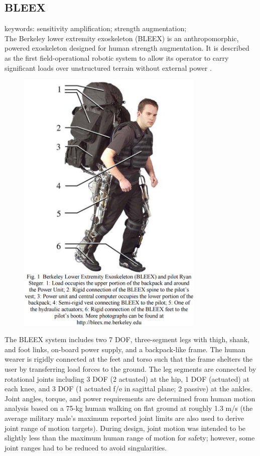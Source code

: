 \subsection{BLEEX}
\label{exo:bleex}

keywords: sensitivity amplification; strength augmentation;\\

The Berkeley lower extremity exoskeleton (BLEEX) is an anthropomorphic, powered exoskeleton designed for human strength augmentation.  It is described as the first field-operational robotic system to allow its operator to carry significant loads over unstructured terrain without external power \cite{bleex_design_2006}.

\begin{figure}[ht]
  \centering
  \includegraphics[width=3.5in]{exos/figs/bleex_exo.png}
\end{figure}

The BLEEX system includes two 7 DOF, three-segment legs with thigh, shank, and foot links, on-board power supply, and a backpack-like frame.  The human wearer is rigidly connected at the feet and torso such that the frame shelters the user by transferring load forces to the ground.  The leg segments are connected by rotational joints including 3 DOF (2 actuated) at the hip, 1 DOF (actuated) at each knee, and 3 DOF (1 actuated f/e in sagittal 
plane; 2 passive) at the ankles.  Joint angles, torque, and power requirements are determined from human motion analysis based on a 75-kg human walking on flat ground at roughly 1.3 m/s (the average military male's maximum reported joint limits are also used to derive joint range of motion targets).  During design, joint motion was intended to be slightly less than the maximum human range of motion for safety; however, some joint ranges had to be reduced to avoid singularities.

